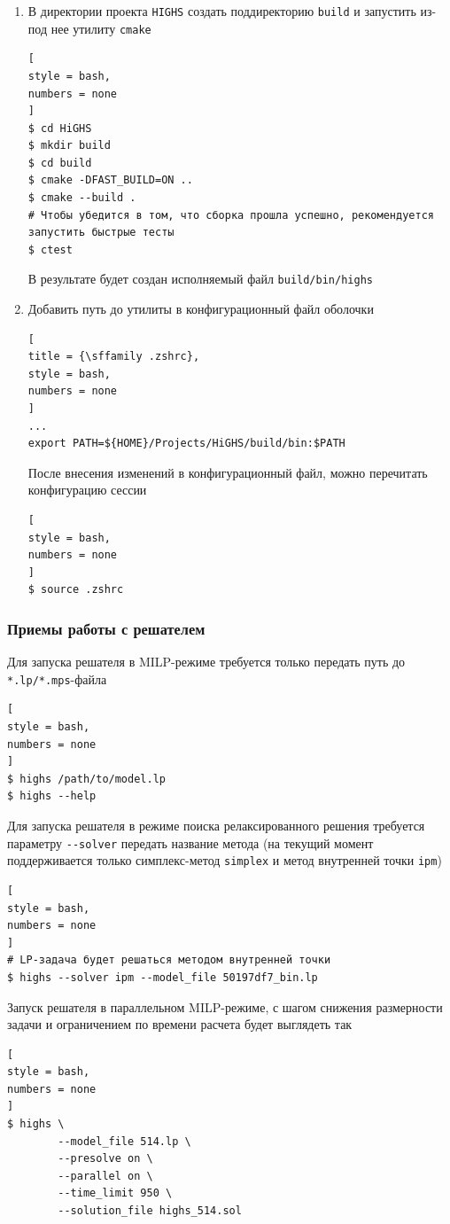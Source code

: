 \documentclass[%
	11pt,
	a4paper,
	utf8,
		]{article}
\begin{document}
\begin{enumerate}
    \item В директории проекта \texttt{HIGHS} создать поддиректорию \texttt{build} и запустить из-под нее утилиту \texttt{cmake}
\begin{lstlisting}[
style = bash,
numbers = none
]
$ cd HiGHS
$ mkdir build
$ cd build
$ cmake -DFAST_BUILD=ON ..
$ cmake --build .
# Чтобы убедится в том, что сборка прошла успешно, рекомендуется запустить быстрые тесты
$ ctest
\end{lstlisting}

В результате будет создан исполняемый файл \texttt{build/bin/highs}
    
    \item Добавить путь до утилиты в конфигурационный файл оболочки
\begin{lstlisting}[
title = {\sffamily .zshrc},
style = bash,
numbers = none
]
...
export PATH=${HOME}/Projects/HiGHS/build/bin:$PATH
\end{lstlisting}

После внесения изменений в конфигурационный файл, можно перечитать конфигурацию сессии
\begin{lstlisting}[
style = bash,
numbers = none
]
$ source .zshrc
\end{lstlisting}
\end{enumerate}
\vspace*{3mm}

\subsubsection{Приемы работы с решателем}

Для запуска решателя в MILP-режиме требуется только передать путь до \texttt{*.lp/*.mps}-файла
\begin{lstlisting}[
style = bash,
numbers = none
]
$ highs /path/to/model.lp
$ highs --help
\end{lstlisting}

Для запуска решателя в режиме поиска релаксированного решения требуется параметру \verb|--solver| передать название метода (на текущий момент поддерживается только симплекс-метод \texttt{simplex} и метод внутренней точки \texttt{ipm})
\begin{lstlisting}[
style = bash,
numbers = none
]
# LP-задача будет решаться методом внутренней точки
$ highs --solver ipm --model_file 50197df7_bin.lp
\end{lstlisting} 

Запуск решателя в параллельном MILP-режиме, с шагом снижения размерности задачи и ограничением по времени расчета будет выглядеть так
\begin{lstlisting}[
style = bash,
numbers = none
]
$ highs \
        --model_file 514.lp \
        --presolve on \
        --parallel on \
        --time_limit 950 \ 
        --solution_file highs_514.sol
\end{lstlisting}
\end{document}
